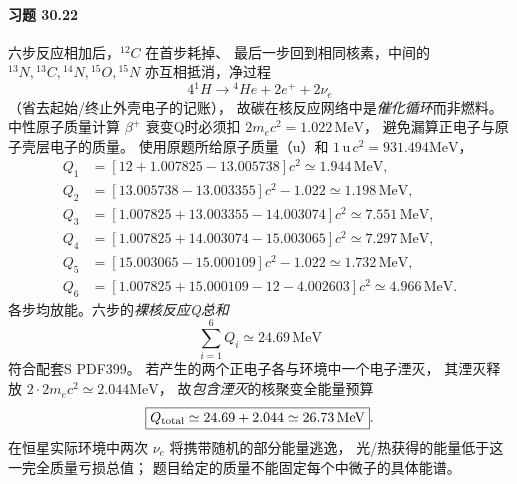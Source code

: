 \paragraph{习题 30.22}
六步反应相加后，\({}^{12}C\) 在首步耗掉、
最后一步回到相同核素，中间的
\({}^{13}N,{}^{13}C,{}^{14}N,{}^{15}O,{}^{15}N\)
亦互相抵消，净过程
\[
\boxed{4{}^{1}H\to{}^{4}He+2e^++2\nu_e}
\]
（省去起始/终止外壳电子的记账），
故碳在核反应网络中是\emph{催化循环}而非燃料。
中性原子质量计算
\(\beta^+\) 衰变Q时必须扣
\(\boxed{2m_ec^2=1.022\,\mathrm{MeV}}\)，
避免漏算正电子与原子壳层电子的质量。
使用原题所给原子质量（u）和
\(1\,\mathrm u\,c^2=931.494\mathrm{MeV}\)，
\[
\begin{aligned}
Q_1&=[12+1.007825-13.005738]c^2
\simeq1.944\,\mathrm{MeV},\\
Q_2&=[13.005738-13.003355]c^2-1.022
\simeq1.198\,\mathrm{MeV},\\
Q_3&=[1.007825+13.003355-14.003074]c^2
\simeq7.551\,\mathrm{MeV},\\
Q_4&=[1.007825+14.003074-15.003065]c^2
\simeq7.297\,\mathrm{MeV},\\
Q_5&=[15.003065-15.000109]c^2-1.022
\simeq1.732\,\mathrm{MeV},\\
Q_6&=[1.007825+15.000109-12-4.002603]c^2
\simeq4.966\,\mathrm{MeV}.
\end{aligned}
\]
各步均放能。六步的\emph{裸核反应Q总和}
\[
\boxed{\sum_{i=1}^6Q_i\simeq24.69\,\mathrm{MeV}}
\]
符合配套S PDF399。
若产生的两个正电子各与环境中一个电子湮灭，
其湮灭释放
\(2\cdot2m_ec^2\simeq2.044\mathrm{MeV}\)，
故\emph{包含湮灭}的核聚变全能量预算
\[
\boxed{Q_{\rm total}\simeq24.69+2.044
\simeq26.73\,\mathrm{MeV}}.
\]
在恒星实际环境中两次
\(\nu_e\) 将携带随机的部分能量逃逸，
光/热获得的能量低于这一完全质量亏损总值；
题目给定的质量不能固定每个中微子的具体能谱。
